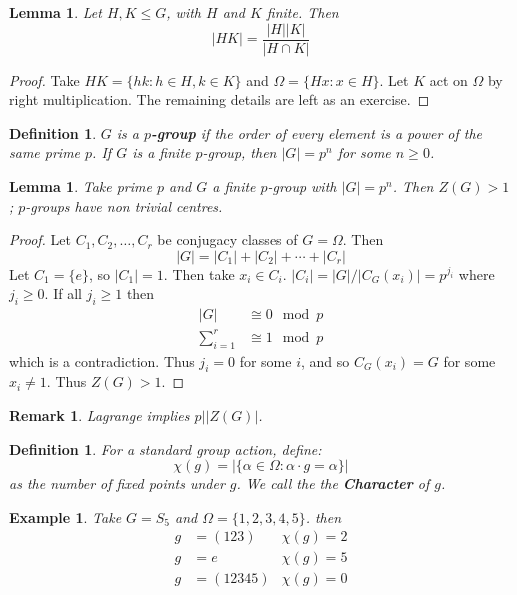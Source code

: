 \documentclass[a4paper,10pt]{article}
\newtheorem{Def}[thm]{Definition}
\newtheorem{eg}[thm]{Example}
\newtheorem{Lem}[thm]{Lemma}
\newtheorem{rem}[thm]{Remark}
\begin{document}
\begin{Lem}
Let $H,K \leq G$, with $H$ and $K$ finite. Then
\[ |HK| = \frac{|H||K|}{|H \cap K|} \]
\end{Lem}

\begin{proof}
Take $HK = \{ hk : h \in H, k \in K\}$ and $\Omega = \{Hx : x \in H\}$. Let $K$ act on $\Omega$ by right multiplication. The remaining details are left as an exercise.
\end{proof}

\begin{Def}
$G$ is a \textbf{$p$-group} if the order of every element is a power of the same prime $p$. If $G$ is a finite $p$-group, then $|G| = p^n$ for some $n \geq 0$. 
\end{Def}

\begin{Lem}
Take prime $p$ and $G$ a finite $p$-group with $|G| = p^n$. Then $Z(G) > 1$; $p$-groups have non trivial centres. 
\end{Lem}

\begin{proof}
Let $C_1, C_2, \dots, C_r$ be conjugacy classes of $G = \Omega$. Then
\[ |G| = |C_1| + |C_2| + \cdots + |C_r| \]
Let $C_1 = \{e\}$, so $|C_1| = 1$. Then take $x_i \in C_i$. $|C_i| = |G| / |C_G(x_i)| = p^{j_i}$ where $j_i \geq 0$. If all $j_i \geq 1$ then
\begin{align*}
|G| &\cong 0 \mod p \\
\sum_{i = 1}^r &\cong 1 \mod p
\end{align*}
which is a contradiction. Thus $j_i = 0$ for some $i$, and so $C_G(x_i) = G$ for some $x_i \neq 1$. Thus $Z(G) > 1$.
\end{proof}

\begin{rem}
Lagrange implies $p \big| |Z(G)|$.
\end{rem}

\begin{Def}
For a standard group action, define:
\[ \chi(g) = | \{ \alpha \in \Omega : \alpha \cdot g = \alpha \} | \]
as the number of fixed points under $g$. We call the the \textbf{Character} of $g$. 
\end{Def}

\begin{eg}
Take $G = S_5$ and $\Omega = \{ 1,2,3,4,5\}$. then
\begin{align*}
g &= (123)             &\chi(g) = 2 \\
g &= e                &\chi(g) = 5 \\
g &= (12345)            &\chi(g) = 0
\end{align*}

\end{eg}
\end{document}
